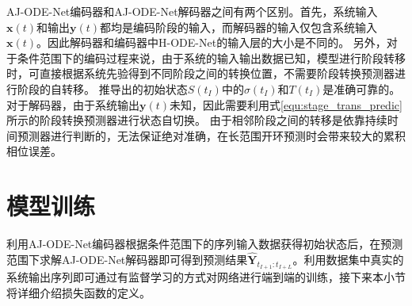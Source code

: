 
AJ-ODE-Net编码器和AJ-ODE-Net解码器之间有两个区别。首先，系统输入$\boldsymbol x(t)$和输出$\boldsymbol y(t)$都均是编码阶段的输入，而解码器的输入仅包含系统输入$\boldsymbol x(t)$。因此解码器和编码器中H-ODE-Net的输入层的大小是不同的。
另外，对于条件范围下的编码过程来说，由于系统的输入输出数据已知，模型进行阶段转移时，可直接根据系统先验得到不同阶段之间的转换位置，不需要阶段转换预测器进行阶段的自转移。
推导出的初始状态$S(t_I)$中的$\sigma(t_I)$和$T(t_I)$是准确可靠的。
对于解码器，由于系统输出$\boldsymbol y(t)$未知，因此需要利用式\ref{equ:stage_trans_predic}所示的阶段转换预测器进行状态自切换。
由于相邻阶段之间的转移是依靠持续时间预测器进行判断的，无法保证绝对准确，在长范围开环预测时会带来较大的累积相位误差。
\section{模型训练}
\label{sec:4_loss_function}
利用AJ-ODE-Net编码器根据条件范围下的序列输入数据获得初始状态后，在预测范围下求解AJ-ODE-Net解码器即可得到预测结果$\hat{\boldsymbol{Y}}_{t_{I+1}: t_{I+L}}$。利用数据集中真实的系统输出序列即可通过有监督学习的方式对网络进行端到端的训练，接下来本小节将详细介绍损失函数的定义。

